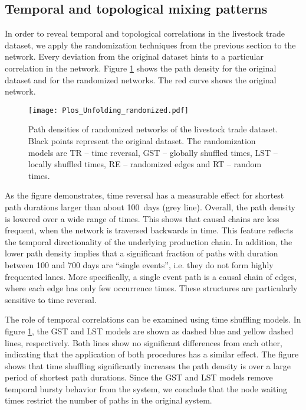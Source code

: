\subsection{Temporal and topological mixing patterns}
In order to reveal temporal and topological correlations in the livestock trade dataset, we apply the randomization techniques from the previous section to the network.
Every deviation from the original dataset hints to a particular correlation in the network.
Figure \ref{fig:randomized_hit} shows the path density for the original dataset and for the randomized networks.
The red curve shows the original network.
\begin{figure}[htb]
\begin{center}
\texttt{[image: Plos\_Unfolding\_randomized.pdf]}
\caption{Path densities of randomized networks of the livestock trade dataset.
Black points represent the original dataset.
The randomization models are TR -- time reversal, GST -- globally shuffled times, LST -- locally shuffled times, RE -- randomized edges and RT -- random times.
}
\label{fig:randomized_hit}
\end{center}
\end{figure}
%
As the figure demonstrates, time reversal has a measurable effect for shortest path durations larger than about 100~days (grey line).
Overall, the path density is lowered over a wide range of times.
This shows that causal chains are less frequent, when the network is traversed backwards in time.
This feature reflects the temporal directionality of the underlying production chain.
In addition, the lower path density implies that a significant fraction of paths with duration between 100 and 700 days are ``single events'', i.e. they do not form highly frequented lanes.
More specifically, a single event path is a causal chain of edges, where each edge has only few occurrence times.
These structures are particularly sensitive to time reversal. 

The role of temporal correlations can be examined using time shuffling models.
In figure \ref{fig:randomized_hit}, the GST and LST models are shown as dashed blue and yellow dashed lines, respectively.
Both lines show no significant differences from each other, indicating that the application of both procedures has a similar effect.
The figure shows that time shuffling significantly increases the path density is over a large period of shortest path durations.
Since the GST and LST models remove temporal bursty behavior from the system, we conclude that the node waiting times restrict the number of paths in the original system. 

